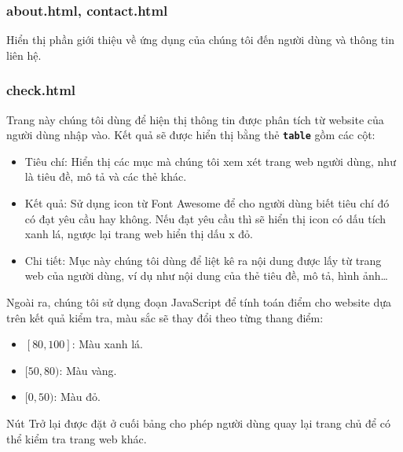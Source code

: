 \subsubsection{about.html, contact.html}
Hiển thị phần giới thiệu về ứng dụng của chúng tôi đến người dùng và thông tin liên hệ.
\subsubsection{check.html}
Trang này chúng tôi dùng để hiện thị thông tin được phân tích từ website của người dùng nhập vào. Kết quả sẽ được hiển thị bằng thẻ \textbf{\texttt{table}} gồm các cột:
\begin{itemize}
	\item Tiêu chí: Hiển thị các mục mà chúng tôi xem xét trang web người dùng, như là tiêu đề, mô tả và các thẻ khác.
	\item Kết quả: Sử dụng icon từ Font Awesome để cho người dùng biết tiêu chí đó có đạt yêu cầu hay không. Nếu đạt yêu cầu thì sẽ hiển thị icon có dấu tích xanh lá, ngược lại trang web hiển thị dấu x đỏ.
	\item Chi tiết: Mục này chúng tôi dùng để liệt kê ra nội dung được lấy từ trang web của người dùng, ví dụ như nội dung của thẻ tiêu đề, mô tả, hình ảnh\ldots
\end{itemize}
\par
Ngoài ra, chúng tôi sử dụng đoạn JavaScript để tính toán điểm cho website dựa trên kết quả kiểm tra, màu sắc sẽ thay đổi theo từng thang điểm:
\begin{itemize}
	\item $[80, 100]$: Màu xanh lá.
	\item $[50, 80)$: Màu vàng.
	\item $[0, 50)$: Màu đỏ.
\end{itemize}
\par
Nút Trở lại được đặt ở cuối bảng cho phép người dùng quay lại trang chủ để có thể kiểm tra trang web khác.
